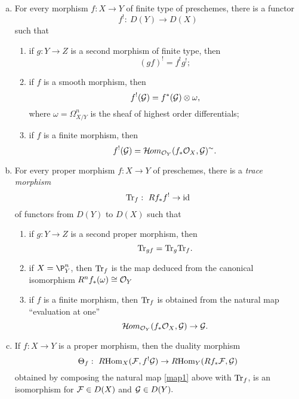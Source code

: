 \begin{theorem}
\begin{enumerate}[(a)]
\item For every morphism $f:X\to Y$ of finite type of preschemes, there is a functor
\[f^!:~D(Y)\to D(X)\]
such that
 \begin{enumerate}[1)]
 \item if $g:Y\to Z$ is a second morphism of finite type, then 
 \[(gf)^!=f^!g^!;\]
 \item if $f$ is a smooth morphism, then 
 \[f^!(\mathcal{G})=f^*(\mathcal{G})\otimes\omega,\]
 where $\omega=\Omega^n_{X/Y}$ is the sheaf of highest order differentials;
 \item if $f$ is a finite morphism, then
 \[f^!(\mathcal{G})=\mathcal{H}\kern -.5pt om_{\mathcal{O}_Y}(f_*\mathcal{O}_X,\mathcal{G})^\sim. \]
 \end{enumerate}
\item For every proper morphism $f:X\to Y$ of preschemes, there is a {\it trace morphism}
\[\mathrm{Tr}_f:~Rf_*f^!\to\mathrm{id}\]
of functors from $D(Y)$ to $D(X)$ such that
 \begin{enumerate}[1)]
 \item if $g:Y\to Z$ is a second proper morphism, then
 \[\mathrm{Tr}_{gf}=\mathrm{Tr}_g\mathrm{Tr}_f.\]
 \item if $X=\P^n_Y$, then $\mathrm{Tr}_f$ is the map deduced from the canonical isomorphism $R^nf_*(\omega)\cong \mathcal{O}_Y$
 \item if $f$ is a finite morphism, then $\mathrm{Tr}_f$ is obtained from the natural map ``evaluation at one''
 \[\mathcal{H}\kern -.5pt om_{\mathcal{O}_Y}(f_*\mathcal{O}_X,\mathcal{G})\to \mathcal{G}.\]
 \end{enumerate}
\item If $f:X\to Y$ is a proper morphism, then the duality morphism
\[\Theta_f:~R\mathrm{Hom}_X(\mathcal{F},f^!\mathcal{G})\to R\mathrm{Hom}_Y(Rf_*\mathcal{F},\mathcal{G})\]
obtained by composing the natural map \ref{map1} above with $\mathrm{Tr}_f$, is an isomorphism for $\mathcal{F}\in D(X)$ and $\mathcal{G}\in D(Y).$
 \end{enumerate}
\end{theorem}


